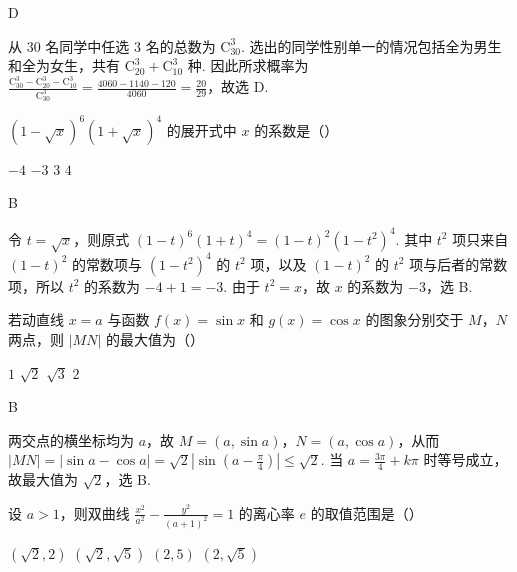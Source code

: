 \begin{answer}
D
\end{answer}

\begin{solution}
从 \(30\) 名同学中任选 \(3\) 名的总数为 \(\mathrm C_{30}^{3}\). 选出的同学性别单一的情况包括全为男生和全为女生，共有 \(\mathrm C_{20}^{3}+\mathrm C_{10}^{3}\) 种. 因此所求概率为 \(\frac{\mathrm C_{30}^{3}-\mathrm C_{20}^{3}-\mathrm C_{10}^{3}}{\mathrm C_{30}^{3}}=\frac{4060-1140-120}{4060}=\frac{20}{29}\)，故选 D.
\end{solution}

\begin{problem}
\((1 - \sqrt{x})^{6}(1 + \sqrt{x})^{4}\) 的展开式中 \(x\) 的系数是（\quad）

\choices
    {\(-4\)}
    {\(-3\)}
    {\(3\)}
    {\(4\)}
\end{problem}

\begin{answer}
B
\end{answer}

\begin{solution}
令 \(t=\sqrt{x}\)，则原式 \((1-t)^6(1+t)^4=(1-t)^2(1-t^2)^4\). 其中 \(t^2\) 项只来自 \((1-t)^2\) 的常数项与 \((1-t^2)^4\) 的 \(t^2\) 项，以及 \((1-t)^2\) 的 \(t^2\) 项与后者的常数项，所以 \(t^2\) 的系数为 \(-4+1=-3\). 由于 \(t^2=x\)，故 \(x\) 的系数为 \(-3\)，选 B.
\end{solution}

\begin{problem}
若动直线 \(x = a\) 与函数 \(f(x) = \sin x\) 和 \(g(x) = \cos x\) 的图象分别交于 \(M\)，\(N\) 两点，则 \(|MN|\) 的最大值为（\quad）

\choices
    {\(1\)}
    {\(\sqrt{2}\)}
    {\(\sqrt{3}\)}
    {\(2\)}
\end{problem}

\begin{answer}
B
\end{answer}

\begin{solution}
两交点的横坐标均为 \(a\)，故 \(M=(a,\sin a)\)，\(N=(a,\cos a)\)，从而 \(|MN|=|\sin a-\cos a|=\sqrt{2}|\sin\left(a-\frac{\pi}{4}\right)|\leqslant\sqrt{2}\). 当 \(a=\frac{3\pi}{4}+k\pi\) 时等号成立，故最大值为 \(\sqrt{2}\)，选 B.
\end{solution}

\begin{problem}
设 \(a > 1\)，则双曲线 \(\frac{x^2}{a^2} - \frac{y^2}{(a + 1)^2} = 1\) 的离心率 \(e\) 的取值范围是（\quad）

\choices
    {\((\sqrt{2}, 2)\)}
    {\((\sqrt{2}, \sqrt{5})\)}
    {\((2,5)\)}
    {\((2, \sqrt{5})\)}
\end{problem}

